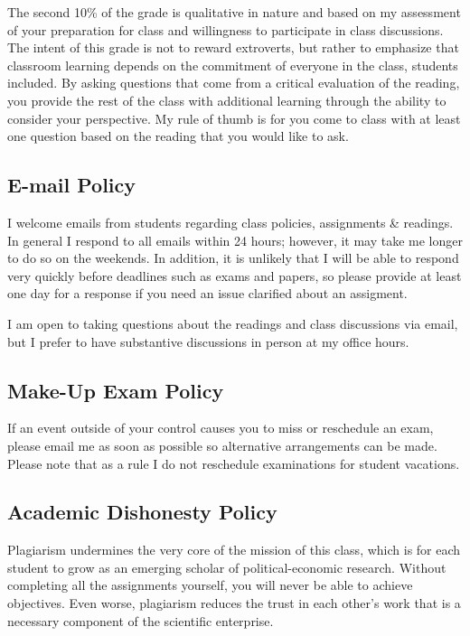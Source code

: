 \documentclass[11pt,]{article}
\begin{document}
The second 10\% of the grade is qualitative in nature and based on my
assessment of your preparation for class and willingness to participate
in class discussions. The intent of this grade is not to reward
extroverts, but rather to emphasize that classroom learning depends on
the commitment of everyone in the class, students included. By asking
questions that come from a critical evaluation of the reading, you
provide the rest of the class with additional learning through the
ability to consider your perspective. My rule of thumb is for you come
to class with at least one question based on the reading that you would
like to ask.

\subsection{E-mail Policy}\label{e-mail-policy}

I welcome emails from students regarding class policies, assignments \&
readings. In general I respond to all emails within 24 hours; however,
it may take me longer to do so on the weekends. In addition, it is
unlikely that I will be able to respond very quickly before deadlines
such as exams and papers, so please provide at least one day for a
response if you need an issue clarified about an assigment.

I am open to taking questions about the readings and class discussions
via email, but I prefer to have substantive discussions in person at my
office hours.

\subsection{Make-Up Exam Policy}\label{make-up-exam-policy}

If an event outside of your control causes you to miss or reschedule an
exam, please email me as soon as possible so alternative arrangements
can be made. Please note that as a rule I do not reschedule examinations
for student vacations.

\subsection{Academic Dishonesty
Policy}\label{academic-dishonesty-policy}

Plagiarism undermines the very core of the mission of this class, which
is for each student to grow as an emerging scholar of political-economic
research. Without completing all the assignments yourself, you will
never be able to achieve objectives. Even worse, plagiarism reduces the
trust in each other's work that is a necessary component of the
scientific enterprise.
\end{document}
